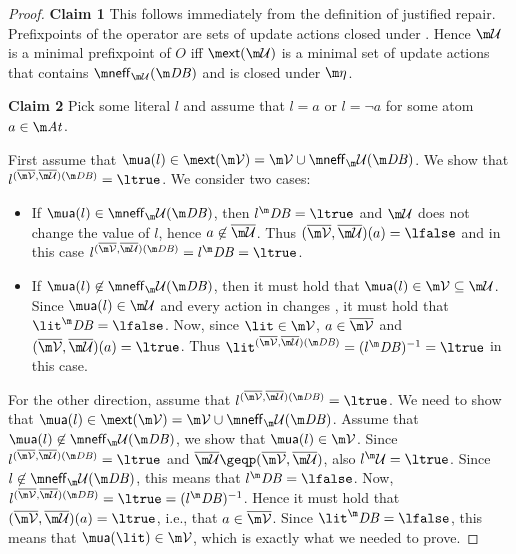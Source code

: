 \begin{proof}
% 

\textbf{Claim 1} This follows immediately from the definition of justified repair. Prefixpoints of the \closure operator are sets of update actions closed under \aics. Hence $\UU$ is a minimal prefixpoint of $O$ iff $\ext(\UU)$ is a minimal set of update actions that contains $\neff_{\UU}(\db)$ and is closed under $\aics$. 





\textbf{Claim 2} Pick some literal $l$ and assume that $l=a$ or $l=\lnot a$ for some atom $a\in \atoms$.

First assume that $\actof(l)\in\ext(\VV)=\VV\cup\neff_\UU(\db)$. We show that $l^{(\overline \VV, \overline \UU)(\db)} = \ltrue$. 
 We consider two cases:
\begin{itemize}
 \item If $\actof(l)\in \neff_\UU(\db)$, then $l^\db = \ltrue$ and $\UU$ does not change the value of $l$, hence $a\not\in\overline\UU$. Thus $(\overline \VV,\overline \UU)(a)=\lfalse$ and in this case $l^{(\overline \VV,\overline \UU)(\db)} = l^\db = \ltrue$. 
 \item If $\actof(l)\not\in \neff_\UU(\db)$, then it must hold that $\actof(l) \in \VV\subseteq \UU$. Since $\actof(l)\in \UU$ and every action in \UU changes \db, it must hold that $\lit^\db=\lfalse$. Now, since $\lit \in \VV$, $a\in \overline \VV$ and $(\overline \VV, \overline \UU) (a) = \ltrue$. Thus $\lit^{(\overline\VV,\overline\UU)(\db)} = (l^\db)^{-1} = \ltrue$ in this case. 
\end{itemize}
For the other direction, assume that $l^{(\overline \VV, \overline \UU)(\db)} = \ltrue$. We need to show that $\actof(l)\in\ext(\VV)=\VV\cup\neff_\UU(\db)$. Assume that $\actof(l)\not\in \neff_\UU(\db)$, we show that $\actof(l)\in \VV$. 
Since $l^{(\overline \VV, \overline \UU)(\db)} = \ltrue$ and $\overline\UU\geqp (\overline\VV,\overline\UU)$, also $l^\UU=\ltrue$. Since $l\not\in \neff_\UU(\db)$, this means that $l^\db=\lfalse$.
Now,
$l^{(\overline \VV, \overline \UU)(\db)} = \ltrue = (l^\db)^{-1}$. Hence it must hold that $(\overline \VV,\overline \UU)(a) = \ltrue$, i.e., that $a\in \overline \VV$. Since $\lit^\db = \lfalse$, this means that $  \actof{(\lit)}\in \VV$, which is exactly what we needed to prove. 



\end{proof}
